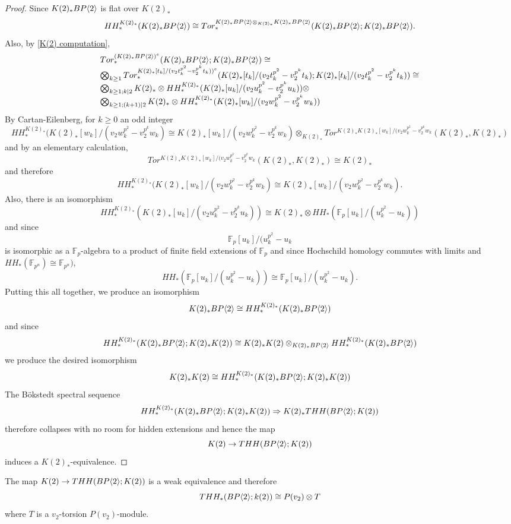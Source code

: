 \begin{proof}
Since $K(2)_*BP\langle 2 \rangle$ is flat over $K(2)_*$
\[ HH_*^{K(2)_*}(K(2)_*BP\langle 2 \rangle)\cong Tor^{K(2)_*BP\langle 2 \rangle\otimes_{K(2)_*}K(2)_*BP\langle 2 \rangle}_*(K(2)_*BP\langle 2 \rangle; K(2)_*BP\langle 2 \rangle).\]
Also, by \eqref{K(2) computation}, 
\[ 
\begin{array}{l}
Tor^{(K(2)_*BP\langle 2 \rangle)^{e}}_*(K(2)_*BP\langle 2 \rangle; K(2)_*BP\langle 2 \rangle)\cong  \\
\bigotimes_{k\ge 1} Tor^{ K(2)_*[t_k]/(v_2t_k^{p^2}-v_2^{p^k}t_k ))^{e}}_*(K(2)_*[t_k]/(v_2t_k^{p^2}-v_2^{p^k}t_k ); K(2)_*[t_k]/(v_2t_k^{p^2}-v_2^{p^k}t_k ))\cong \\
\bigotimes_{k\ge 1; k|2}K(2)_*\otimes  HH_*^{K(2)_*}(K(2)_*[u_k]/(v_2u_k^{p^2}-v_2^{p^k}u_k ))\otimes \\
\bigotimes_{k\ge 1; (k+1)|2}K(2)_*\otimes  HH_*^{K(2)_*}(K(2)_*[w_k]/(v_2w_k^{p^2}-v_2^{p^k}w_k ))
\end{array}
\]
By Cartan-Eilenberg, for $k\ge0$ an odd integer
\[HH_*^{K(2)_*}(K(2)_*[w_k]/(v_2w_k^{p^2}-v_2^{p^k}w_k )\cong K(2)_*[w_k]/(v_2w_k^{p^2}-v_2^{p^k}w_k)\otimes_{K(2)_*} Tor^{K(2)_*K(2)_*[w_k]/(v_2w_k^{p^2}-v_2^{p^k}w_k }(K(2)_*,K(2)_*)\]
and by an elementary calculation, 
\[Tor^{K(2)_*K(2)_*[w_k]/(v_2w_k^{p^2}-v_2^{p^k}w_k }(K(2)_*,K(2)_*)\cong K(2)_*\]
and therefore 
\[HH_*^{K(2)_*}(K(2)_*[w_k]/(v_2w_k^{p^2}-v_2^{p^k}w_k )\cong K(2)_*[w_k]/(v_2w_k^{p^2}-v_2^{p^k}w_k). \]
Also, there is an isomorphism 
\[HH_*^{K(2)_*}(K(2)_*[u_k]/(v_2u_k^{p^2}-v_2^{p^k}u_k ))\cong K(2)_*\otimes HH_*(\mathbb{F}_p[u_k]/(u_k^{p^2}-u_k ))\]
and since 
\[\mathbb{F}_p[u_k]/(u_k^{p^2}-u_k  \]
is isomorphic as a $\mathbb{F}_p$-algebra to a product of finite field extensions of $\mathbb{F}_p$  and since Hochschild homology commutes with limits and $HH_*(\mathbb{F}_{p^n})\cong \mathbb{F}_{p^n})$,
\[ HH_*(\mathbb{F}_p[u_k]/(u_k^{p^2}-u_k ))\cong \mathbb{F}_p[u_k]/(u_k^{p^2}-u_k ). \]
Putting this all together, we produce an isomorphism
\[ K(2)_*BP\langle 2 \rangle\cong HH_*^{K(2)_*}(K(2)_*BP\langle 2 \rangle)\] 
and since 
\[ HH_*^{K(2)_*}(K(2)_*BP\langle 2 \rangle;K(2)_*K(2))\cong K(2)_*K(2)\otimes_{K(2)_*BP\langle 2 \rangle} HH_*^{K(2)_*}(K(2)_*BP\langle 2 \rangle)\]
we produce the desired isomorphism 
\[K(2)_*K(2)\cong HH_*^{K(2)_*}(K(2)_*BP\langle 2 \rangle;K(2)_*K(2))\]
The B\"okstedt spectral sequence 
\[HH_*^{K(2)_*}(K(2)_*BP\langle 2 \rangle;K(2)_*K(2)) \Rightarrow  K(2)_*THH(BP\langle 2 \rangle;K(2)) \]
therefore collapses with no room for hidden extensions and hence the map 
\[ K(2)\rightarrow THH(BP\langle 2 \rangle;K(2)) \]
induces a $K(2)_*$-equivalence.
\end{proof}
\begin{cor}
The map $K(2)\rightarrow THH(BP\langle 2 \rangle;K(2))$ is a weak equivalence and therefore 
\[ THH_*(BP\langle 2 \rangle;k(2))\cong P(v_2)\otimes T \] 
where $T$ is a $v_2$-torsion $P(v_2)$-module. 
\end{cor}
